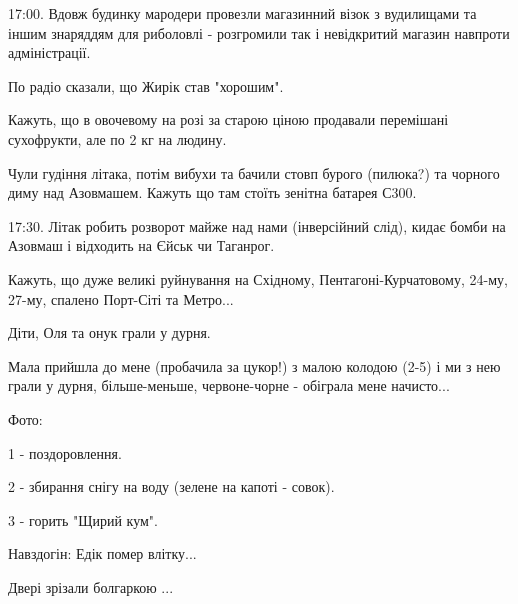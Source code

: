 17:00. Вдовж будинку мародери провезли магазинний візок з вудилищами та іншим
знаряддям для риболовлі - розгромили так і невідкритий магазин навпроти
адміністрації.

По радіо сказали, що Жирік став "хорошим".

Кажуть, що в овочевому на розі за старою ціною продавали перемішані сухофрукти,
але по 2 кг на людину.


Чули гудіння літака, потім вибухи та бачили стовп бурого (пилюка?) та чорного
диму над Азовмашем. Кажуть що там стоїть зенітна батарея С300.

17:30. Літак робить розворот майже над нами (інверсійний слід), кидає бомби на
Азовмаш і відходить на Єйськ чи Таганрог.

Кажуть, що дуже великі руйнування на Східному, Пентагоні-Курчатовому, 24-му,
27-му, спалено Порт-Сіті та Метро...

Діти, Оля та онук  грали у дурня.

Мала прийшла до мене (пробачила за цукор!) з малою колодою (2-5) і ми з нею
грали у дурня, більше-меньше, червоне-чорне - обіграла мене начисто...

Фото:

1 - поздоровлення.

2 - збирання снігу на воду (зелене на капоті - совок). 

3 - горить "Щирий кум".

Навздогін: Едік помер влітку... 

Двері зрізали болгаркою ...


